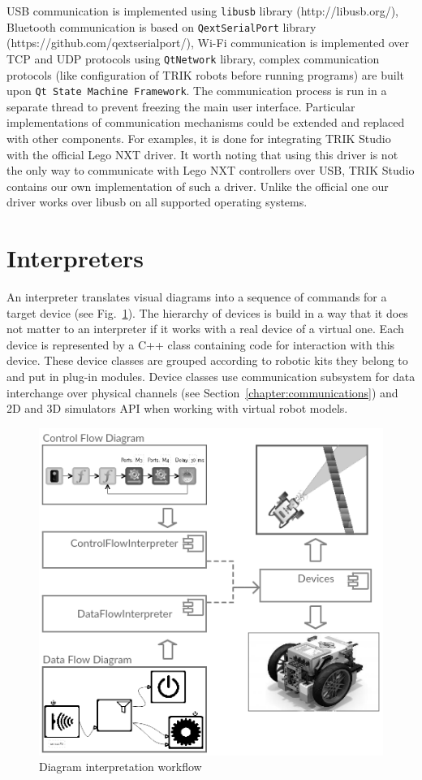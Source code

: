 \documentclass[conference]{IEEEtran}
\begin{document}
USB communication is implemented using \texttt{libusb} library (http://libusb.org/), Bluetooth communication is based on \texttt{QextSerialPort} library (https://github.com/qextserialport/), Wi-Fi communication is implemented over TCP and UDP protocols using \texttt{QtNetwork} library, complex communication protocols (like configuration of TRIK robots before running programs) are built upon \texttt{Qt State Machine Framework}. The communication process is run in a separate thread to prevent freezing the main user interface. Particular implementations of communication mechanisms could be extended and replaced with other components. For examples, it is done for integrating TRIK Studio with the official Lego NXT driver. It worth noting that using this driver is not the only way to communicate with Lego NXT controllers over USB, TRIK Studio contains our own implementation of such a driver. Unlike the official one our driver works over libusb on all supported operating systems.

\section{Interpreters}
\label{chapter:interpreters}

An interpreter translates visual diagrams into a sequence of commands for a target device (see Fig.~\ref{image:interpretersTSArch}). The hierarchy of devices is build in a way that it does not matter to an interpreter if it works with a real device of a virtual one. Each device is represented by a C++ class containing code for interaction with this device. These device classes are grouped according to robotic kits they belong to and put in plug-in modules. Device classes use communication subsystem for data interchange over physical channels (see Section~\ref{chapter:communications}) and 2D and 3D simulators API when working with virtual robot models. 

\begin{figure}[ht]
    \includegraphics[width=0.9\columnwidth]{TS_Interpreter_Architecture.png}
    \caption{Diagram interpretation workflow}
    \label{image:interpretersTSArch}
\end{figure}
\end{document}
